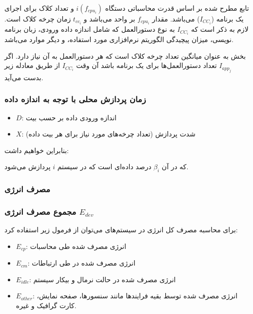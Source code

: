 تابع مطرح شده بر اساس قدرت محاسباتی دستگاه $i(f_{cpu_i})$ و تعداد کلاک 
برای اجرای یک برنامه ($I_{CC_i}$) می‌باشد. مقدار $f_{cpu_i}$ بر واحد 
می‌باشد و $t_{cc_i}$ زمان چرخه کلاک است. لازم به ذکر است که $I_{CC_i}$ به نوع
دستورالعمل که شامل اندازه داده ورودی، زبان برنامه نویسی، میزان پیچیدگی الگوریتم
نرم‌افزاری مورد استفاده، و دیگر موارد می‌باشد.

بخش  به عنوان میانگین تعداد چرخه کلاک است
که هر دستورالعمل به آن نیاز دارد. اگر $I_{app_j}$ تعداد دستورالعمل‌ها برای یک
برنامه باشد آن وقت $I_{CC_i}$ از طریق معادله زیر بدست می‌آید.


\subsubsection{زمان پردازش محلی با توجه به اندازه داده }


\begin{itemize}
    \item $D$: اندازه ورودی داده بر حسب بیت
    \item $X$: شدت پردازش (تعداد چرخه‌های مورد نیاز برای هر بیت داده)
\end{itemize}

بنابراین خواهیم داشت:


که در آن $\beta_{i}$ درصد داده‌‌ای است که در سیستم $i$ پردازش می‌شود.

\subsubsection{مصرف انرژی}

\subsubsection{مجموع مصرف انرژی $E_{dev}$}

برای محاسبه مصرف کل انرژی در سیستم‌های  می‌توان از فرمول زیر استفاده
کرد:


\begin{itemize}
    \item $E_{cp}$: انرژی مصرف شده طی محاسبات
    \item $E_{cm}$: انرژی مصرف شده در طی ارتباطات
    \item $E_{idle}$: انرژی مصرف شده در حالت نرمال و بیکار سیستم
    \item $E_{other}$: انرژی مصرف شده توسط بقیه فرایند‌ها مانند سنسور‌ها، صفحه
    نمایش، کارت گرافیک و غیره.
\end{itemize}

